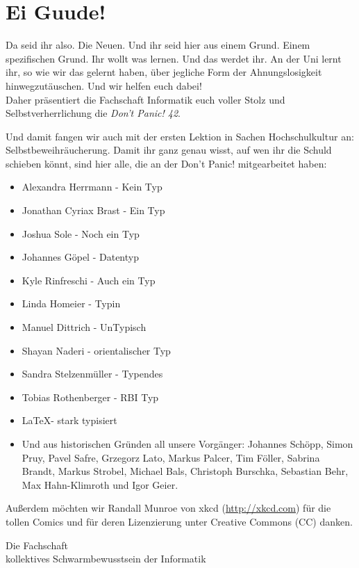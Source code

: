 \section*{Ei Guude!}
Da seid ihr also. Die Neuen. Und ihr seid hier aus einem Grund. Einem spezifischen Grund. Ihr wollt was lernen.
Und das werdet ihr. An der Uni lernt ihr, so wie wir das gelernt haben,
\"uber jegliche Form der Ahnungslosigkeit hinwegzut\"auschen. Und wir helfen euch dabei!\\
Daher pr\"asentiert die Fachschaft Informatik euch voller Stolz und Selbstverherrlichung die \emph{Don't Panic! 42}.

Und damit fangen wir auch mit der ersten Lektion in Sachen Hochschulkultur an: Selbstbeweihr\"aucherung.
Damit ihr ganz genau wisst, auf wen ihr die Schuld schieben k\"onnt, sind hier alle, die an der Don't Panic! mitgearbeitet haben:
\begin{itemize}
	\item Alexandra Herrmann - Kein Typ
	\item Jonathan Cyriax Brast - Ein Typ
	\item Joshua Sole - Noch ein Typ
	\item Johannes Göpel - Datentyp
	\item Kyle Rinfreschi - Auch ein Typ
	\item Linda Homeier - Typin
	\item Manuel Dittrich - UnTypisch  
	\item Shayan Naderi - orientalischer Typ
	\item Sandra Stelzenmüller - Typendes
	\item Tobias Rothenberger - RBI Typ
	\item \LaTeX - stark typisiert
	\item Und aus historischen Gr\"unden all unsere Vorg\"anger:
	Johannes Sch\"opp, Simon Pruy, Pavel Safre, Grzegorz Lato, Markus Palcer, Tim F\"oller, Sabrina Brandt, Markus Strobel, Michael Bals, Christoph Burschka, Sebastian Behr, Max Hahn-Klimroth und Igor Geier.
\end{itemize}
Außerdem möchten wir Randall Munroe von xkcd (\url{http://xkcd.com}) für die tollen Comics und f\"ur deren Lizenzierung unter Creative Commons (CC) danken.\\

\begin{flushright}Die Fachschaft\\\tiny kollektives Schwarmbewusstsein der Informatik\end{flushright}
